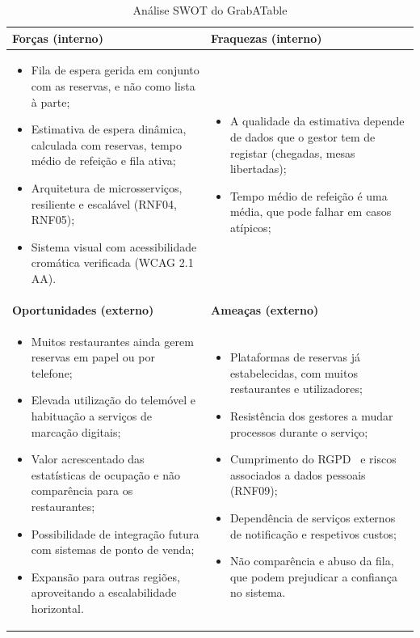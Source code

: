 \begin{table}[ht]
\centering
\small
\renewcommand{\arraystretch}{1.25}
\begin{tabularx}{\textwidth}{@{}>{\raggedright\arraybackslash}X>{\raggedright\arraybackslash}X@{}}
\toprule
\textbf{Forças (interno)} & \textbf{Fraquezas (interno)} \\
\midrule
\begin{itemize}[nosep,leftmargin=*]
  \item Fila de espera gerida em conjunto com as reservas, e não como lista à parte;
  \item Estimativa de espera dinâmica, calculada com reservas, tempo médio de refeição e fila ativa;
  \item Arquitetura de microsserviços, resiliente e escalável (RNF04, RNF05);
  \item Sistema visual com acessibilidade cromática verificada (WCAG 2.1 AA).
\end{itemize}
&
\begin{itemize}[nosep,leftmargin=*]
  \item A qualidade da estimativa depende de dados que o gestor tem de registar (chegadas, mesas libertadas);
  \item Tempo médio de refeição é uma média, que pode falhar em casos atípicos;
\end{itemize} \\
\midrule
\textbf{Oportunidades (externo)} & \textbf{Ameaças (externo)} \\
\midrule
\begin{itemize}[nosep,leftmargin=*]
  \item Muitos restaurantes ainda gerem reservas em papel ou por telefone;
  \item Elevada utilização do telemóvel e habituação a serviços de marcação digitais;
  \item Valor acrescentado das estatísticas de ocupação e não comparência para os restaurantes;
  \item Possibilidade de integração futura com sistemas de ponto de venda;
  \item Expansão para outras regiões, aproveitando a escalabilidade horizontal.
\end{itemize}
&
\begin{itemize}[nosep,leftmargin=*]
  \item Plataformas de reservas já estabelecidas, com muitos restaurantes e utilizadores;
  \item Resistência dos gestores a mudar processos durante o serviço;
  \item Cumprimento do RGPD~\cite{rgpd} e riscos associados a dados pessoais (RNF09);
  \item Dependência de serviços externos de notificação e respetivos custos;
  \item Não comparência e abuso da fila, que podem prejudicar a confiança no sistema.
\end{itemize} \\
\bottomrule
\end{tabularx}
\caption{Análise SWOT do GrabATable}
\end{table}